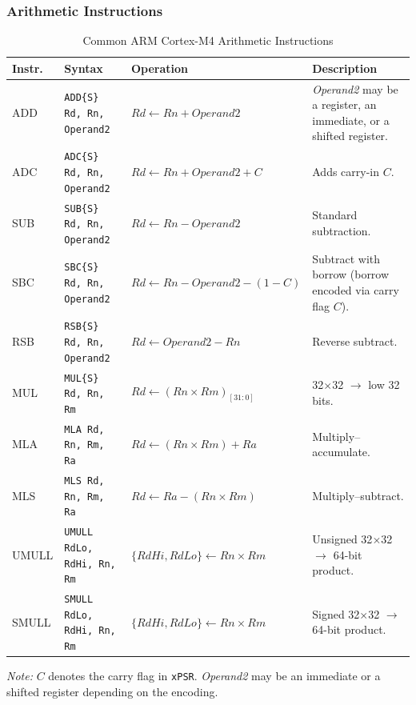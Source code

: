 \subsubsection{Arithmetic Instructions}
\begin{table}[H]
\centering
\caption{Common ARM Cortex-M4 Arithmetic Instructions}
\small
\begin{tabularx}{\linewidth}{@{}l l l X@{}}
\toprule
\textbf{Instr.} & \textbf{Syntax} & \textbf{Operation} & \textbf{Description} \\
\midrule
ADD  & \texttt{ADD\{S\} Rd, Rn, Operand2}
     & $Rd \leftarrow Rn + Operand2$
     & \emph{Operand2} may be a register, an immediate, or a shifted register. \\
ADC  & \texttt{ADC\{S\} Rd, Rn, Operand2}
     & $Rd \leftarrow Rn + Operand2 + C$
     & Adds carry-in $C$. \\
SUB  & \texttt{SUB\{S\} Rd, Rn, Operand2}
     & $Rd \leftarrow Rn - Operand2$
     & Standard subtraction. \\
SBC  & \texttt{SBC\{S\} Rd, Rn, Operand2}
     & $Rd \leftarrow Rn - Operand2 - (1 - C)$
     & Subtract with borrow (borrow encoded via carry flag $C$). \\
RSB  & \texttt{RSB\{S\} Rd, Rn, Operand2}
     & $Rd \leftarrow Operand2 - Rn$
     & Reverse subtract. \\
MUL  & \texttt{MUL\{S\} Rd, Rn, Rm}
     & $Rd \leftarrow (Rn \times Rm)_{[31{:}0]}$
     & 32$\times$32 $\rightarrow$ low 32 bits. \\
MLA  & \texttt{MLA Rd, Rn, Rm, Ra}
     & $Rd \leftarrow (Rn \times Rm) + Ra$
     & Multiply–accumulate. \\
MLS  & \texttt{MLS Rd, Rn, Rm, Ra}
     & $Rd \leftarrow Ra - (Rn \times Rm)$
     & Multiply–subtract. \\
UMULL & \texttt{UMULL RdLo, RdHi, Rn, Rm}
      & $\{RdHi,RdLo\} \leftarrow Rn \times Rm$
      & Unsigned 32$\times$32 $\rightarrow$ 64-bit product. \\
SMULL & \texttt{SMULL RdLo, RdHi, Rn, Rm}
      & $\{RdHi,RdLo\} \leftarrow Rn \times Rm$
      & Signed 32$\times$32 $\rightarrow$ 64-bit product. \\
\bottomrule
\end{tabularx}

\vspace{2pt}
\footnotesize\emph{Note:} $C$ denotes the carry flag in \texttt{xPSR}. \emph{Operand2} may be an immediate or a shifted register depending on the encoding.
\end{table}
